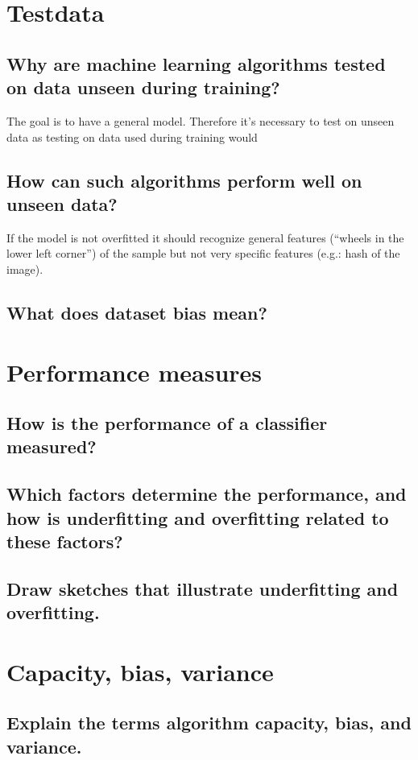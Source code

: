 \section{Testdata}
\subsection{Why are machine learning algorithms tested on data unseen during training?}
The goal is to have a general model. Therefore it's necessary to test on unseen data as testing on data used during training would 
\subsection{How can such algorithms perform well on unseen data?}
If the model is not overfitted it should recognize general features (``wheels in the lower left corner'') of the sample but not very specific features (e.g.: hash of the image). 
\subsection{What does dataset bias mean? }

\section{Performance measures}
\subsection{How is the performance of a classifier measured?}
\subsection{Which factors determine the performance, and how is underfitting and overfitting related to these factors?}
\subsection{Draw sketches that illustrate underfitting and overfitting.}

\section{Capacity, bias, variance}
\subsection{Explain the terms algorithm capacity, bias, and variance.}
